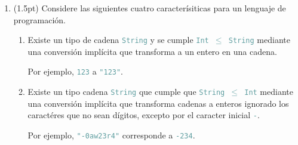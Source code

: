 \documentclass{article}
\newcommand{\tp}[1]{\textcolor{CadetBlue} {\texttt{#1}}}
\newcommand{\tb}[1]{\textcolor{RoyalPurple} {\textbf{#1}}}
\newcommand{\ti}[1]{\textcolor{RoyalPurple} {\textit{#1}}}
\newcommand{\pt}[1]{\textcolor{RoyalPurple}{(#1pt)}}
\begin{document}
\begin{enumerate}
\begin{verbatim}
N 3 = 22 + (f 3) + 37

N 4 = g 22 (f 4)

N 4 = 22 + (f 4) + 33 + (g y)

N x = h (f x) (44 - y) (g y)
        \end{verbatim}

        Defina la versión \tp{cps} de \tp{N}, denotada por \tp{cpsN}. Para esto,
        puede suponer definidas las versiones \tp{cps} de \tp{f, g, h},
        denotadas por \tp{cpsf, cpsg, cpsh}.

        \ti{Atención:} Las operaciones aritméticas deben permanecer sin cambios.
        Es decir, no se piden las versiones \tp{cps} de \tp{+, -}.\\

		\tb{Solución}
		\begin{verbatim}
cpsN 0 k = 17

cpsN 1 k = cpsf (1 + 13) (\v -> k v)

cpsN 2 k = k (22 + (2-3) + 2)

cpsN 3 k = cpsf 3 (\v -> k (22 + v + 37))

cpsN 4 k = cpsg 22 (\v1 -> cpsf 4 (\v2 -> k(v1 + v2))

cpsN 5 k = cpsf 4 (\v1 -> cpsg y (\v2 -> k(22 + v1 + 33+ v2)))

cpsN x k = cpsf x (\v1 -> cpsg y (\v2 -> cpsh v1 (44 -y) v2 (\v3 -> k v3)))
		\end{verbatim}

        \item \pt{1.5} Considere las siguientes cuatro caracterísiticas para un
        lenguaje de programación.

        \begin{enumerate}
            \item Existe un tipo de cadena \tp{String} y se cumple
            \tp{Int $\leq$ String} mediante una conversión implícita que
            transforma a un entero en una cadena.

            Por ejemplo, \tp{123} a \tp{"123"}.

            \item Existe un tipo cadena \tp{String} que cumple que
            \tp{String $\leq$ Int} mediante una conversión implícita que
            transforma cadenas a enteros ignorado los caractéres que no sean
            dígitos, excepto por el caracter inicial \tp{-}.

            Por ejemplo, \tp{"}\tp{-0aw23r4"} corresponde a \tp{-234}.


\end{enumerate}
\end{enumerate}
\end{document}
